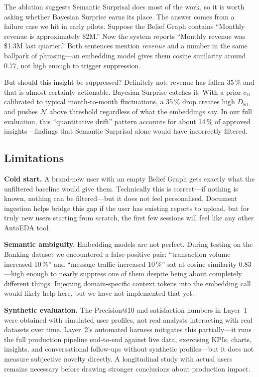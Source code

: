 \documentclass[conference]{IEEEtran}
\begin{document}
The ablation suggests Semantic Surprisal does most of the work, so
it is worth asking whether Bayesian Surprise earns its place.
The answer comes from a failure case we hit in early pilots. Suppose
the Belief Graph contains ``Monthly revenue is approximately \$2M.''
Now the system reports ``Monthly revenue was \$1.3M last quarter.''
Both sentences mention \emph{revenue} and a number in the same
ballpark of phrasing---an embedding model gives them cosine similarity
around 0.77, not high enough to trigger suppression.

But should this insight be suppressed? Definitely not: revenue has
fallen 35\,\% and that is almost certainly actionable. Bayesian
Surprise catches it. With a prior $\sigma_0$ calibrated to typical
month-to-month fluctuations, a 35\,\% drop creates high $D_{\mathrm{KL}}$
and pushes $\mathcal{N}$ above threshold regardless of what the
embeddings say. In our full evaluation, this ``quantitative drift''
pattern accounts for about 14\,\% of approved insights---findings
that Semantic Surprisal alone would have incorrectly filtered.

\subsection{Limitations}

\textbf{Cold start.} A brand-new user with an empty Belief Graph
gets exactly what the unfiltered baseline would give them. Technically
this is correct---if nothing is known, nothing can be filtered---but
it does not feel personalised. Document ingestion helps bridge this
gap if the user has existing reports to upload, but for truly new
users starting from scratch, the first few sessions will feel like
any other AutoEDA tool.

\textbf{Semantic ambiguity.} Embedding models are not perfect.
During testing on the Banking dataset we encountered a false-positive
pair: ``transaction volume increased 10\,\%'' and ``message traffic
increased 10\,\%'' sat at cosine similarity 0.83---high enough to
nearly suppress one of them despite being about completely different
things. Injecting domain-specific context tokens into the embedding
call would likely help here, but we have not implemented that yet.

\textbf{Synthetic evaluation.} The Precision@10 and satisfaction
numbers in Layer~1 were obtained with simulated user profiles, not
real analysts interacting with real datasets over time. Layer~2's
automated harness mitigates this partially---it runs the full
production pipeline end-to-end against live data, exercising KPIs,
charts, insights, and conversational follow-ups without synthetic
profiles---but it does not measure subjective novelty directly. A
longitudinal study with actual users remains necessary before drawing
stronger conclusions about production impact.
\end{document}

